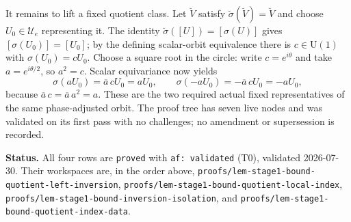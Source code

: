 It remains to lift a fixed quotient class.  Let $\breve V$ satisfy
$\breve\sigma(\breve V)=\breve V$ and choose $U_0\in\mathcal U_e$ representing it.  The
identity $\breve\sigma([U])=[\sigma(U)]$ gives
$[\sigma(U_0)]=[U_0]$; by the defining scalar-orbit equivalence there is
$c\in\mathrm U(1)$ with $\sigma(U_0)=cU_0$.  Choose a square root in the circle: write
$c=e^{i\theta}$ and take $a=e^{i\theta/2}$, so $a^2=c$.  Scalar equivariance now yields
\[
 \sigma(aU_0)=\overline a\,cU_0=aU_0,
 \qquad
 \sigma(-aU_0)=-\overline a\,cU_0=-aU_0,
\]
because $\overline a\,c=\overline a\,a^2=a$.  These are the two required actual fixed representatives of
the same phase-adjusted orbit.  The proof tree has seven live nodes and was validated on
its first pass with no challenges; no amendment or supersession is recorded.

\medskip
\noindent\textbf{Status.} All four rows are \texttt{proved} with
\texttt{af: validated} (T0), validated 2026-07-30.  Their workspaces are, in the order
above, \texttt{proofs/lem-stage1-bound-quotient-left-inversion},
\texttt{proofs/lem-stage1-bound-quotient-local-index},
\texttt{proofs/lem-stage1-bound-inversion-isolation}, and
\texttt{proofs/lem-stage1-bound-quotient-index-data}.
